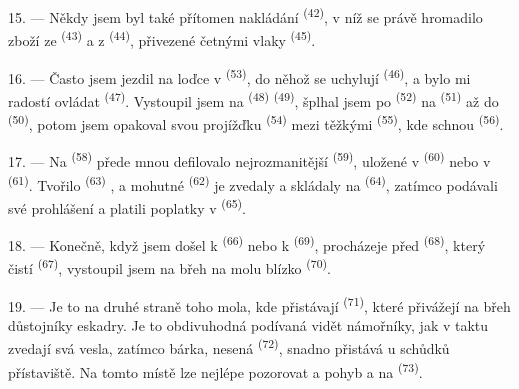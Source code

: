 15. --- Někdy jsem byl také přítomen nakládání  \textsuperscript{(42)},
v níž se právě hromadilo zboží ze  \textsuperscript{(43)} a z
 \textsuperscript{(44)}, přivezené četnými vlaky
 \textsuperscript{(45)}.

\VUsaut{3.0mm}
\VUsaut{3.0mm}

16. --- Často jsem jezdil na loďce v  \textsuperscript{(53)}, do něhož
se uchylují  \textsuperscript{(46)}, a bylo mi radostí ovládat
 \textsuperscript{(47)}. Vystoupil jsem na 
\textsuperscript{(48)}  \textsuperscript{(49)}, šplhal jsem po
 \textsuperscript{(52)} na  \textsuperscript{(51)} až do
 \textsuperscript{(50)}, potom jsem opakoval svou projížďku
 \textsuperscript{(54)} mezi těžkými 
\textsuperscript{(55)}, kde schnou  \textsuperscript{(56)}.

17. --- Na  \textsuperscript{(58)} přede mnou defilovalo nejrozmanitější
 \textsuperscript{(59)}, uložené v 
\textsuperscript{(60)} nebo v  \textsuperscript{(61)}. Tvořilo
 \textsuperscript{(63)} , a mohutné
 \textsuperscript{(62)} je zvedaly a skládaly na  \textsuperscript{(64)}, zatímco  podávali své prohlášení a platili
poplatky v  \textsuperscript{(65)}.

18. --- Konečně, když jsem došel k  \textsuperscript{(66)} nebo k
 \textsuperscript{(69)}, procházeje před 
\textsuperscript{(68)}, který čistí  \textsuperscript{(67)}, vystoupil jsem na
břeh na molu blízko  \textsuperscript{(70)}.

19. --- Je to na druhé straně toho mola, kde přistávají 
\textsuperscript{(71)}, které přivážejí na břeh důstojníky eskadry. Je to obdivuhodná podívaná
vidět námořníky, jak v taktu zvedají svá vesla, zatímco bárka, nesená
 \textsuperscript{(72)}, snadno přistává u schůdků přístaviště. Na tomto
místě lze nejlépe pozorovat  a pohyb  a
 na  \textsuperscript{(73)}.

